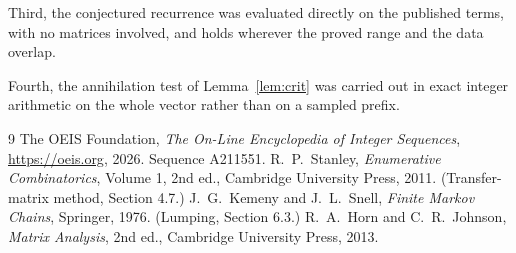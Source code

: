 \documentclass[11pt,a4paper]{article}
\theoremstyle{plain}
\theoremstyle{definition}
\begin{document}
Third, the conjectured recurrence was evaluated directly on the published terms, with no
matrices involved, and holds wherever the proved range and the data overlap.

Fourth, the annihilation test of Lemma~\ref{lem:crit} was carried out in exact integer
arithmetic on the whole vector rather than on a sampled prefix.

\begin{thebibliography}{9}
 The OEIS Foundation, \emph{The On-Line Encyclopedia of Integer
Sequences}, \url{https://oeis.org}, 2026. Sequence A211551.
 R.~P.~Stanley, \emph{Enumerative Combinatorics}, Volume 1, 2nd ed.,
Cambridge University Press, 2011. (Transfer-matrix method, Section 4.7.)
 J.~G.~Kemeny and J.~L.~Snell, \emph{Finite Markov Chains}, Springer, 1976.
(Lumping, Section 6.3.)
 R.~A.~Horn and C.~R.~Johnson, \emph{Matrix Analysis}, 2nd ed., Cambridge
University Press, 2013.
\end{thebibliography}
\end{document}
